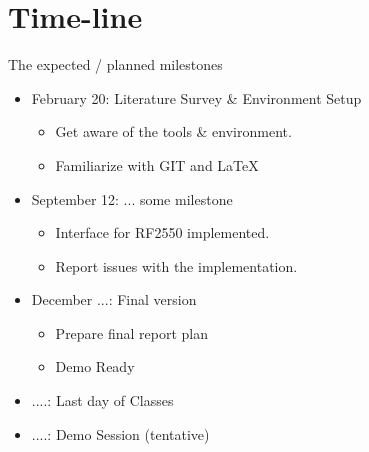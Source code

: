 \documentclass[11pt,twocolumn]{article}
\begin{document}
\section{Time-line}

The expected / planned milestones

\begin{itemize}
\item{February 20: Literature Survey \& Environment Setup}
	\begin{itemize}
		\item Get aware of the tools \& environment. 
	        \item Familiarize with GIT and \LaTeX
	\end{itemize}

\item{September 12: ... some milestone} 
	\begin{itemize}
		\item Interface for RF2550 implemented.
		\item Report issues with the implementation.
	\end{itemize}


\item{December ...:  Final version}
	\begin{itemize}
	\item Prepare final report plan
	\item Demo Ready
	\end{itemize}

\item{....: Last day of Classes}

\item{....: Demo Session (tentative)} 

\end{itemize}
\end{document}
